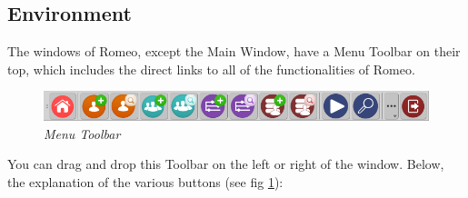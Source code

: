 \subsection{Environment}
\label{environment}
The windows of Romeo, except the Main Window, have a Menu Toolbar on their top, which includes the direct links to all of the functionalities of Romeo.
\begin{figure}[!h]
\begin{center}
\includegraphics[scale=0.5]{./Images/MenuToolbar}
\caption{\textit{Menu Toolbar}}
\label{menutoolbar}
\end{center}
\end{figure}
You can drag and drop this Toolbar on the left or right of the window. Below, the explanation of the various buttons (see fig \ref{menutoolbar}):
